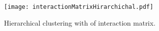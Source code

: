 \documentclass{article}
\begin{document}
\begin{figure}[ht]
	\begin{center}
		\texttt{[image: interactionMatrixHirarchichal.pdf]}
	\end{center}
	\caption{Hierarchical clustering with of interaction matrix.}
	\label{fig:intMH}
\end{figure}
\end{document}
